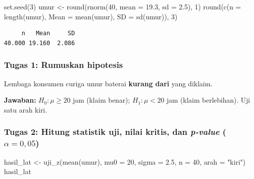 \documentclass[
  indonesian,
  letterpaper,
]{book}
\newenvironment{Shaded}{\begin{snugshade}}{\end{snugshade}}
\newcommand{\AttributeTok}[1]{\textcolor[rgb]{0.40,0.45,0.13}{#1}}
\newcommand{\DecValTok}[1]{\textcolor[rgb]{0.68,0.00,0.00}{#1}}
\newcommand{\FloatTok}[1]{\textcolor[rgb]{0.68,0.00,0.00}{#1}}
\newcommand{\FunctionTok}[1]{\textcolor[rgb]{0.28,0.35,0.67}{#1}}
\newcommand{\NormalTok}[1]{\textcolor[rgb]{0.00,0.23,0.31}{#1}}
\newcommand{\OtherTok}[1]{\textcolor[rgb]{0.00,0.23,0.31}{#1}}
\newcommand{\StringTok}[1]{\textcolor[rgb]{0.13,0.47,0.30}{#1}}
\begin{document}
\begin{Shaded}
\begin{Highlighting}[]
\FunctionTok{set.seed}\NormalTok{(}\DecValTok{3}\NormalTok{)}
\NormalTok{umur }\OtherTok{\textless{}{-}} \FunctionTok{round}\NormalTok{(}\FunctionTok{rnorm}\NormalTok{(}\DecValTok{40}\NormalTok{, }\AttributeTok{mean =} \FloatTok{19.3}\NormalTok{, }\AttributeTok{sd =} \FloatTok{2.5}\NormalTok{), }\DecValTok{1}\NormalTok{)}
\FunctionTok{round}\NormalTok{(}\FunctionTok{c}\NormalTok{(}\AttributeTok{n =} \FunctionTok{length}\NormalTok{(umur), }\AttributeTok{Mean =} \FunctionTok{mean}\NormalTok{(umur), }\AttributeTok{SD =} \FunctionTok{sd}\NormalTok{(umur)), }\DecValTok{3}\NormalTok{)}
\end{Highlighting}
\end{Shaded}

\begin{verbatim}
     n   Mean     SD 
40.000 19.160  2.086 
\end{verbatim}

\subsubsection{Tugas 1: Rumuskan
hipotesis}\label{tugas-1-rumuskan-hipotesis}

Lembaga konsumen curiga umur baterai \textbf{kurang dari} yang diklaim.

\textbf{Jawaban:} \(H_0 : \mu \geq 20\) jam (klaim benar);
\(H_1 : \mu < 20\) jam (klaim berlebihan). Uji satu arah kiri.

\subsubsection{\texorpdfstring{Tugas 2: Hitung statistik uji, nilai
kritis, dan \emph{p-value}
(\(\alpha = 0{,}05\))}{Tugas 2: Hitung statistik uji, nilai kritis, dan p-value (\textbackslash alpha = 0\{,\}05)}}\label{tugas-2-hitung-statistik-uji-nilai-kritis-dan-p-value-alpha-005}

\begin{Shaded}
\begin{Highlighting}[]
\NormalTok{hasil\_lat }\OtherTok{\textless{}{-}} \FunctionTok{uji\_z}\NormalTok{(}\FunctionTok{mean}\NormalTok{(umur), }\AttributeTok{mu0 =} \DecValTok{20}\NormalTok{, }\AttributeTok{sigma =} \FloatTok{2.5}\NormalTok{, }\AttributeTok{n =} \DecValTok{40}\NormalTok{, }\AttributeTok{arah =} \StringTok{"kiri"}\NormalTok{)}
\NormalTok{hasil\_lat}
\end{Highlighting}
\end{Shaded}
\end{document}
